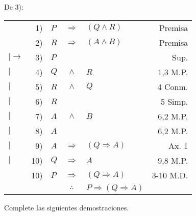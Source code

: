 \documentclass[12pt]{report}
\theoremstyle{largebreak}
\begin{document}
\begin{sol}
        De 3):
        \begin{center}
            \begin{tabular}{l r l c l r}
                & 1) & $P$ & $\Rightarrow$ & $(Q\land R)$ & Premisa \\
                & 2) & $R$ & $\Rightarrow$ & $(A\land B)$ & Premisa \\
                $|\longrightarrow$& 3) & $P$ &  &  & Sup. \\
                $|$& 4) & $Q$ & $\land$ & $R$ & 1,3 M.P.\\
                $|$& 5) & $R$ & $\land$ & $Q$ & 4 Conm.\\
                $|$& 6) & $R$ &  &  & 5 Simp.\\
                $|$& 7) & $A$ & $\land$ & $B$ & 6,2 M.P.\\
                $|$& 8) & $A$ &  &  & 6,2 M.P.\\
                $|$& 9) & $A$ & $\Rightarrow$ & $(Q\Rightarrow A)$ & Ax. 1\\
                $|$& 10) & $Q$ & $\Rightarrow$ & $A$ & 9,8 M.P.\\
                \hline
                & 10) & $P$ & $\Rightarrow$ & $(Q\Rightarrow A)$ & 3-10 M.D.\\
                \hline
                & & & $\therefore$ & $P\Rightarrow(Q\Rightarrow A)$ & \\
            \end{tabular}
        \end{center}
    \end{sol}

    \begin{excer}
        Complete las siguientes demostraciones.
    \end{excer}
\end{document}
